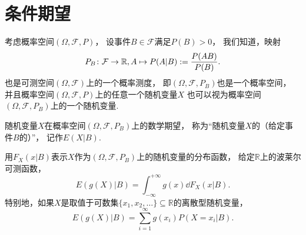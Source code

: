 \section{条件期望}
考虑概率空间\((\Omega,\mathcal{F},P)\)，
设事件\(B \in \mathcal{F}\)满足\(P(B) > 0\)，
我们知道，映射\begin{equation*}
	P_B\colon \mathcal{F} \to \mathbb{R},
	A \mapsto P(A \vert B) := \frac{P(AB)}{P(B)}.
\end{equation*}
也是可测空间\((\Omega,\mathcal{F})\)上的一个概率测度，
即\((\Omega,\mathcal{F},P_B)\)也是一个概率空间，
并且概率空间\((\Omega,\mathcal{F},P)\)上的任意一个随机变量\(X\)
也可以视为概率空间\((\Omega,\mathcal{F},P_B)\)上的一个随机变量.

\begin{definition}
随机变量\(X\)在概率空间\((\Omega,\mathcal{F},P_B)\)上的数学期望，
称为“随机变量\(X\)的（给定事件\(B\)的）”，
记作\(E(X \vert B)\).
\end{definition}

用\(F_X(x \vert B)\)表示\(X\)作为\((\Omega,\mathcal{F},P_B)\)上的随机变量的分布函数，
给定\(\mathbb{R}\)上的波莱尔可测函数，
\begin{equation}
	E(g(X) \vert B)
	= \int_{-\infty}^{+\infty} g(x) \dd{F_X(x \vert B)}.
\end{equation}
特别地，如果\(X\)是取值于可数集\(\{x_1,x_2,\dotsc\} \subseteq \mathbb{R}\)的离散型随机变量，
\begin{equation}
	E(g(X) \vert B)
	= \sum_{i=1}^\infty g(x_i) P(X=x_i \vert B).
\end{equation}


